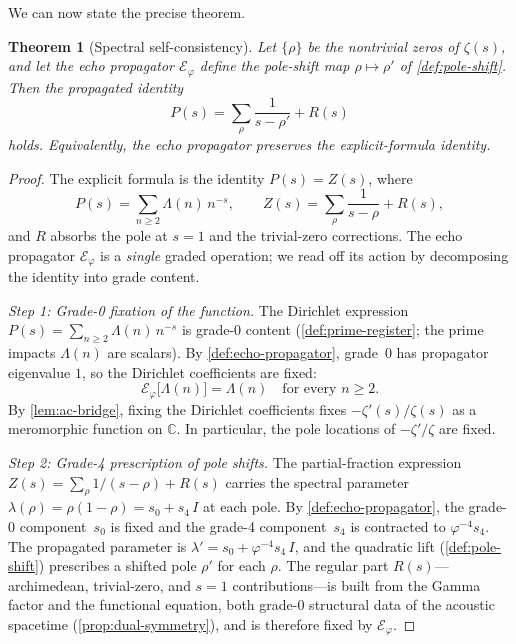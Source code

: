 \documentclass[11pt,a4paper]{article}
\theoremstyle{plain}
\newtheorem{theorem}{Theorem}[section]
\theoremstyle{definition}
\theoremstyle{remark}
\numberwithin{equation}{section}
\newcommand{\vp}{\varphi}
\begin{document}
\medskip\noindent We can now state the precise theorem.

\begin{theorem}[Spectral self-consistency]
\label{thm:spectral-self-consistency}
Let \(\{\rho\}\) be the nontrivial zeros of \(\zeta(s)\), and let the
echo propagator \(\mathcal{E}_\vp\) define the pole-shift map
\(\rho\mapsto\rho'\) of \cref{def:pole-shift}.  Then the propagated
identity
\begin{equation}\label{eq:propagated-identity}
  P(s) = \sum_\rho \frac{1}{s-\rho'} + R(s)
\end{equation}
holds.  Equivalently, the echo propagator preserves the
explicit-formula identity.
\end{theorem}

\begin{proof}
The explicit formula is the identity \(P(s)=Z(s)\), where
\[
  P(s)=\sum_{n\ge2}\Lambda(n)\,n^{-s},
  \qquad
  Z(s)=\sum_\rho\frac{1}{s-\rho}+R(s),
\]
and \(R\) absorbs the pole at \(s=1\) and the trivial-zero
corrections.  The echo propagator \(\mathcal{E}_\vp\) is a
\emph{single} graded operation; we read off its action by
decomposing the identity into grade content.

\smallskip\noindent\emph{Step 1: Grade-0 fixation of the function.}
The Dirichlet expression
\(P(s)=\sum_{n\ge2}\Lambda(n)\,n^{-s}\) is grade-0 content
(\cref{def:prime-register}; the prime impacts \(\Lambda(n)\) are
scalars).  By \cref{def:echo-propagator}, grade~0 has propagator
eigenvalue \(1\), so the Dirichlet coefficients are fixed:
\[
  \mathcal{E}_\vp\bigl[\Lambda(n)\bigr] = \Lambda(n)
  \quad \text{for every } n\ge2.
\]
By \cref{lem:ac-bridge}, fixing the Dirichlet coefficients fixes
\(-\zeta'(s)/\zeta(s)\) as a meromorphic function on \(\mathbb{C}\).
In particular, the pole locations of \(-\zeta'/\zeta\) are fixed.

\smallskip\noindent\emph{Step 2: Grade-4 prescription of pole shifts.}
The partial-fraction expression
\(Z(s)=\sum_\rho 1/(s-\rho)+R(s)\) carries the spectral parameter
\(\lambda(\rho)=\rho(1-\rho)=s_0+s_4\,I\) at each pole.  By
\cref{def:echo-propagator}, the grade-0 component~\(s_0\) is fixed
and the grade-4 component~\(s_4\) is contracted to
\(\vp^{-4}s_4\).  The propagated parameter is
\(\lambda'=s_0+\vp^{-4}s_4\,I\), and the quadratic lift
(\cref{def:pole-shift}) prescribes a shifted pole \(\rho'\) for
each \(\rho\).  The regular part \(R(s)\)---archimedean,
trivial-zero, and \(s=1\) contributions---is built from the
Gamma factor and the functional equation, both grade-0 structural
data of the acoustic spacetime (\cref{prop:dual-symmetry}), and is
therefore fixed by \(\mathcal{E}_\vp\).


\end{proof}
\end{document}
